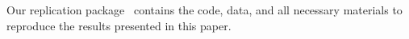 
\label{sec:data_availability}
Our replication package~\cite{replication_package} contains the code, data, and all necessary materials to reproduce the results presented in this paper.

